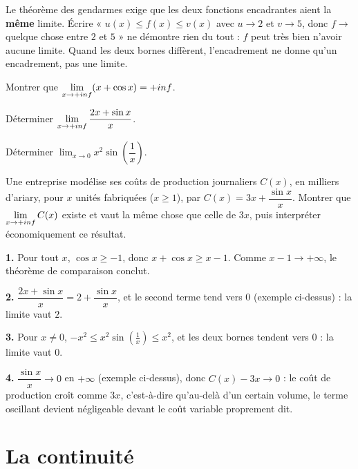 \begin{erreurclassique}
Le théorème des gendarmes exige que les deux fonctions encadrantes aient la
\textbf{même} limite. Écrire « $u(x) \leq f(x) \leq v(x)$ avec $u \to 2$ et
$v \to 5$, donc $f \to$ quelque chose entre $2$ et $5$ » ne démontre rien du
tout : $f$ peut très bien n'avoir aucune limite. Quand les deux bornes
diffèrent, l'encadrement ne donne qu'un encadrement, pas une limite.
\end{erreurclassique}

\begin{entrainement}
\exo[\niveau{1}] Montrer que $\limpinf (x + \cos x) = +\infty$.

\exo[\niveau{2}] Déterminer $\limpinf \dfrac{2x + \sin x}{x}$.

\exo[\niveau{2}] Déterminer $\displaystyle\lim_{x \to 0} x^{2}\sin\!\left(\dfrac{1}{x}\right)$.

\exo[\niveau{3}] Une entreprise modélise ses coûts de production journaliers
$C(x)$, en milliers d'ariary, pour $x$ unités fabriquées ($x \geq 1$), par
$C(x) = 3x + \dfrac{\sin x}{x}$. Montrer que $\limpinf C(x) $ existe et vaut
la même chose que celle de $3x$, puis interpréter économiquement ce résultat.
\end{entrainement}

\begin{corrige}
\textbf{1.} Pour tout $x$, $\cos x \geq -1$, donc $x + \cos x \geq x - 1$.
Comme $x - 1 \to +\infty$, le théorème de comparaison conclut.

\textbf{2.} $\dfrac{2x+\sin x}{x} = 2 + \dfrac{\sin x}{x}$, et le second terme
tend vers $0$ (exemple ci-dessus) : la limite vaut $2$.

\textbf{3.} Pour $x \neq 0$, $-x^{2} \leq x^{2}\sin\!\left(\tfrac{1}{x}\right) \leq x^{2}$,
et les deux bornes tendent vers $0$ : la limite vaut $0$.

\textbf{4.} $\dfrac{\sin x}{x} \to 0$ en $+\infty$ (exemple ci-dessus), donc
$C(x) - 3x \to 0$ : le coût de production croît comme $3x$, c'est-à-dire
qu'au-delà d'un certain volume, le terme oscillant devient négligeable devant
le coût variable proprement dit.
\end{corrige}

\section{La continuité}

